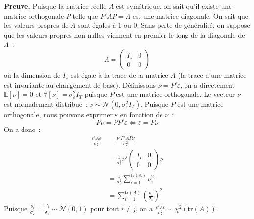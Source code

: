 \documentclass[10pt,a4paper]{article}
\theoremstyle{definition}
\renewcommand{\newline}{\unskip\par\vspace{1.5pt}}
\begin{document}
\begin{notes}
\begin{itemize}
       \textbf{Preuve.} Puisque la matrice réelle $A$ est symétrique,
       on sait qu'il existe une matrice orthogonale $P$ telle
       que $P'AP = \Lambda$ est une matrice diagonale. On sait que les
       valeurs propres de $A$ sont égales à 1 ou 0. Sans perte de
       généralité, on suppose que les valeurs propres non nulles
       viennent en premier le long de la diagonale de $\Lambda$~:
       \[
         \Lambda =
         \begin{pmatrix}
           I_{\star} & 0 \\
           0 & 0
         \end{pmatrix}
       \]
       où la dimension de $I_{\star}$ est égale à la trace de la
       matrice $A$ (la trace d'une matrice est invariante au
       changement de base). Définissons $\nu = P'\varepsilon$, on a
       directement $\mathbb E[\nu] = 0$
       et $\mathbb V[\nu] = \sigma_{\varepsilon}^2I_T$ puisque $P$ est
       une matrice orthogonale. Le vecteur $\nu$ est normalement
       distribué~:
       $\nu \sim \mathcal N \left( 0, \sigma_{\varepsilon}^2I_T \right)$. Puisque
       $P$ est une matrice orthogonale, nous pouvons
       exprimer $\varepsilon$ en fonction de $\nu$~:
       \[
         P\nu = PP'\varepsilon \Leftrightarrow \varepsilon = P\nu
       \]
       On a donc~:
       \[
         \begin{split}
           \frac{\varepsilon' A \varepsilon}{\sigma_{\varepsilon}^2} &= \frac{\nu'P'A P \nu}{\sigma_{\varepsilon}^2}\\
                                                                     &= \frac{1}{\sigma_{\varepsilon}^2}\nu'
                                                                       \begin{pmatrix}
                                                                         I_{\star} & 0\\
                                                                         0 & 0
                                                                       \end{pmatrix} \nu \\
                                                                     &= \frac{1}{\sigma_{\varepsilon}^2}\sum_{i=1}^{\mathrm{tr}(A)}\nu_i^2\\
                                                                     &= \sum_{i=1}^{\mathrm{tr}(A)}\left( \frac{\nu_i}{\sigma_{\varepsilon}} \right)^2
         \end{split}
       \]
       Puisque $\frac{\nu_i}{\sigma_\varepsilon} \perp \frac{\nu_j}{\sigma_\varepsilon} \sim \mathcal N(0,1)$ pour tout $i\neq j$, on a $\frac{\varepsilon' A \varepsilon}{\sigma_{\varepsilon}^2}\sim\chi^2\left( \mathrm{tr}(A) \right)$.\newline


\end{itemize}
\end{notes}
\end{document}

